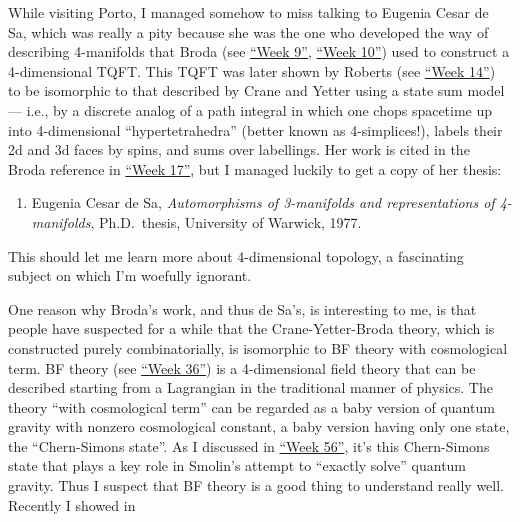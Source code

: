 \documentclass{article}
\def\tightlist{}
\renewcommand{\texttt}[1]{%
  \begingroup
  \ttfamily
  \begingroup\lccode`~=`/\lowercase{\endgroup\def~}{/\discretionary{}{}{}}%
  \begingroup\lccode`~=`[\lowercase{\endgroup\def~}{[\discretionary{}{}{}}%
  \begingroup\lccode`~=`.\lowercase{\endgroup\def~}{.\discretionary{}{}{}}%
  \catcode`/=\active\catcode`[=\active\catcode`.=\active
  \scantokens{#1\noexpand}%
  \endgroup
}
\begin{document}
While visiting Porto, I managed somehow to miss talking to Eugenia Cesar
de Sa, which was really a pity because she was the one who developed the
way of describing 4-manifolds that Broda (see
\protect\hyperlink{week9}{``Week 9''}, \protect\hyperlink{week10}{``Week
10''}) used to construct a 4-dimensional TQFT. This TQFT was later shown
by Roberts (see \protect\hyperlink{week14}{``Week 14''}) to be
isomorphic to that described by Crane and Yetter using a state sum model
--- i.e., by a discrete analog of a path integral in which one chops
spacetime up into 4-dimensional ``hypertetrahedra'' (better known as
4-simplices!), labels their 2d and 3d faces by spins, and sums over
labellings. Her work is cited in the Broda reference in
\protect\hyperlink{week17}{``Week 17''}, but I managed luckily to get a
copy of her thesis:

\begin{enumerate}
\def\labelenumi{\arabic{enumi})}
\setcounter{enumi}{3}
\tightlist
\item
  Eugenia Cesar de Sa, \emph{Automorphisms of 3-manifolds and
  representations of 4-manifolds}, Ph.D.~thesis, University of Warwick,
  1977.
\end{enumerate}

This should let me learn more about 4-dimensional topology, a
fascinating subject on which I'm woefully ignorant.

One reason why Broda's work, and thus de Sa's, is interesting to me, is
that people have suspected for a while that the Crane-Yetter-Broda
theory, which is constructed purely combinatorially, is isomorphic to BF
theory with cosmological term. BF theory (see
\protect\hyperlink{week36}{``Week 36''}) is a 4-dimensional field theory
that can be described starting from a Lagrangian in the traditional
manner of physics. The theory ``with cosmological term'' can be regarded
as a baby version of quantum gravity with nonzero cosmological constant,
a baby version having only one state, the ``Chern-Simons state''. As I
discussed in \protect\hyperlink{week56}{``Week 56''}, it's this
Chern-Simons state that plays a key role in Smolin's attempt to
``exactly solve'' quantum gravity. Thus I suspect that BF theory is a
good thing to understand really well. Recently I showed in

\end{document}
